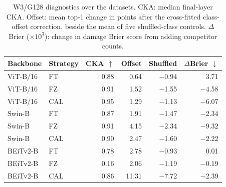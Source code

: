 \begin{table}[h]
\centering
\caption{W3/G128 diagnostics over the {} datasets. CKA: median final-layer CKA. Offset: mean top-1 change in points after the cross-fitted class-offset correction, beside the mean of five shuffled-class controls. $\Delta$Brier ($\times 10^{3}$): change in damage Brier score from adding competitor counts.}
\label{tab:diagnostics}
\setlength{\tabcolsep}{3pt}
\small
\begin{tabular}{llrrrr}
\toprule
Backbone & Strategy & CKA $\uparrow$ & Offset & Shuffled & $\Delta$Brier $\downarrow$ \\
\midrule
ViT-B/16 & FT & 0.88 & 0.64 & $-$0.94 & 3.71 \\
ViT-B/16 & FZ & 0.91 & 1.52 & $-$1.55 & $-$4.58 \\
ViT-B/16 & CAL & 0.95 & 1.29 & $-$1.13 & $-$6.07 \\
Swin-B & FT & 0.87 & 1.91 & $-$1.47 & $-$2.34 \\
Swin-B & FZ & 0.91 & 4.15 & $-$2.34 & $-$9.32 \\
Swin-B & CAL & 0.90 & 2.47 & $-$1.60 & $-$2.22 \\
BEiTv2-B & FT & 0.78 & 2.78 & $-$0.93 & 0.01 \\
BEiTv2-B & FZ & 0.16 & 2.06 & $-$1.19 & $-$0.19 \\
BEiTv2-B & CAL & 0.86 & 11.31 & $-$7.72 & $-$2.39 \\
\bottomrule
\end{tabular}
\end{table}
